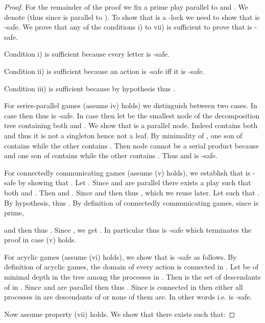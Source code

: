 \documentclass[a4paper,UKenglish]{lipics-v2016}
\begin{document}
\begin{proof}
For the remainder of the proof we fix  a prime play parallel to  and .
We  denote  (thus  since  is parallel to ).
To show that  is a -lock we need to show that  is -safe.
We prove that any of the conditions i) to vii) is sufficient to prove that  is -safe.

\medskip

Condition i) is sufficient because every letter is -safe. 

\medskip

Condition ii) is sufficient because an action is -safe iff it is  -safe.

\medskip


Condition iii) is sufficient because by hypothesis  thus .

\medskip


For series-parallel games (assume iv) holds) we distinguish between two cases.
In case  then 
thus  is -safe.
In case  then let  be the smallest node of the decomposition tree containing both  and .
We show that  is a parallel node.
Indeed  contains both  and  thus it is not a singleton hence not a leaf.
By minimality of , one son of  contains  while the other contains .
Then node  cannot be a serial product because
 and one son of  contains  while the other contains .
Thus  and  is -safe.

\medskip

For connectedly communicating games (assume (v) holds),
we establish that  is -safe 
by showing that .
Let .
Since  and  are parallel there exists a play 
such that both  and .
Then  and .
Since  and  then 
 thus , which we reuse later.
Let  such that .
By hypothesis, 
 thus .
By definition of connectedly communicating games,
since  is prime,

and 
 then
 thus  .
Since , we get .
In particular  thus  is -safe which terminates the proof in case (v) holds.

\medskip

For acyclic games (assume (vi) holds), we show that  is -safe as follows.
By definition of acyclic games,
the domain of every action is connected in .
Let  be of minimal depth in the tree
 among the processes in .
Then   is the set of descendants of  in .
Since  and  are parallel then 
thus .
Since  is connected in  then either all processes in  are descendants of  or none of them are.
In other words  i.e.  is -safe.

\medskip

Now assume property (vii) holds.
We show that there exists  such that:


\end{proof}
\end{document}
